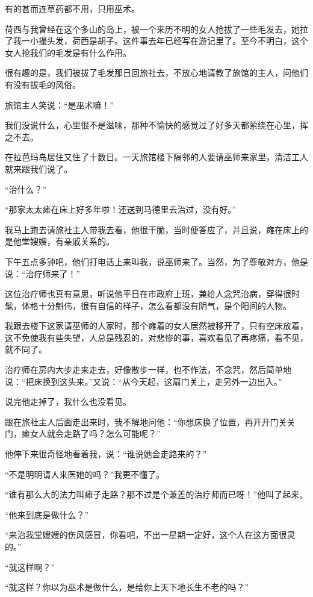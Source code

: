 \par 有的甚而连草药都不用，只用巫术。
\par 荷西与我曾经在这个多山的岛上，被一个来历不明的女人抢拔了一些毛发去，她拉了我一小撮头发，荷西是胡子。这件事去年已经写在游记里了。至今不明白，这个女人抢我们的毛发是有什么作用。
\par 很有趣的是，我们被拔了毛发那日回旅社去，不放心地请教了旅馆的主人，问他们有没有拔毛的风俗。
\par 旅馆主人笑说：“是巫术嘛！”
\par 我们没说什么，心里很不是滋味，那种不愉快的感觉过了好多天都萦绕在心里，挥之不去。
\par 在拉芭玛岛居住又住了十数日。一天旅馆楼下隔邻的人要请巫师来家里，清洁工人就来跟我们说了。
\par “治什么？”
\par “那家太太瘫在床上好多年啦！还送到马德里去治过，没有好。”
\par 我马上跑去请旅社主人带我去看，他很干脆，当时便答应了，并且说，瘫在床上的是他堂嫂嫂，有亲戚关系的。
\par 下午五点多钟吧，他们打电话上来叫我，说巫师来了。当然，为了尊敬对方，他是说：“治疗师来了！”
\par 这位治疗师也真有意思，听说他平日在市政府上班，兼给人念咒治病，穿得很时髦，体格十分魁伟，很有自信的样子，怎么看都没有阴气，是个阳间的人物。
\par 我跟去楼下这家请巫师的人家时，那个瘫着的女人居然被移开了，只有空床放着，这不免使我有些失望，人总是残忍的，对悲惨的事，喜欢看见了再疼痛，看不见，就不同了。
\par 治疗师在房内大步走来走去，好像散步一样，也不作法，不念咒，然后简单地说：“把床换到这头来。”又说：“从今天起，这扇门关上，走另外一边出入。”
\par 说完他走掉了，我什么也没看见。
\par 跟在旅社主人后面走出来时，我不解地问他：“你想床换了位置，再开开门关关门，瘫女人就会走路了吗？怎么可能呢？”
\par 他停下来很奇怪地看着我，说：“谁说她会走路来的？”
\par “不是明明请人来医她的吗？”我更不懂了。
\par “谁有那么大的法力叫瘫子走路？那不过是个兼差的治疗师而已呀！”他叫了起来。
\par “他来到底是做什么？”
\par “来治我堂嫂嫂的伤风感冒，你看吧，不出一星期一定好，这个人在这方面很灵的。”
\par “就这样啊？”
\par “就这样？你以为巫术是做什么，是给你上天下地长生不老的吗？”

